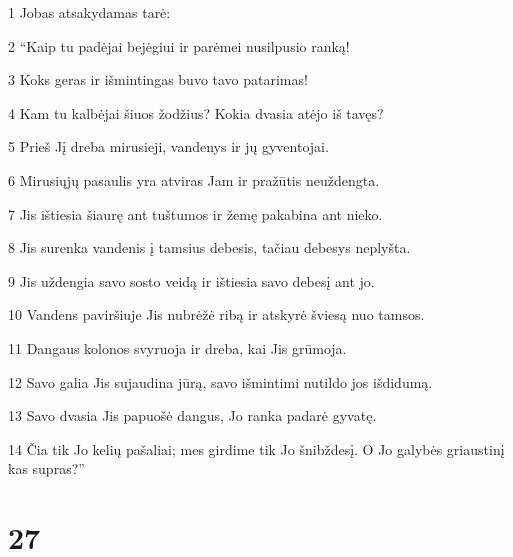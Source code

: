 \par 1 Jobas atsakydamas tarė: 
\par 2 “Kaip tu padėjai bejėgiui ir parėmei nusilpusio ranką! 
\par 3 Koks geras ir išmintingas buvo tavo patarimas! 
\par 4 Kam tu kalbėjai šiuos žodžius? Kokia dvasia atėjo iš tavęs? 
\par 5 Prieš Jį dreba mirusieji, vandenys ir jų gyventojai. 
\par 6 Mirusiųjų pasaulis yra atviras Jam ir pražūtis neuždengta. 
\par 7 Jis ištiesia šiaurę ant tuštumos ir žemę pakabina ant nieko. 
\par 8 Jis surenka vandenis į tamsius debesis, tačiau debesys neplyšta. 
\par 9 Jis uždengia savo sosto veidą ir ištiesia savo debesį ant jo. 
\par 10 Vandens paviršiuje Jis nubrėžė ribą ir atskyrė šviesą nuo tamsos. 
\par 11 Dangaus kolonos svyruoja ir dreba, kai Jis grūmoja. 
\par 12 Savo galia Jis sujaudina jūrą, savo išmintimi nutildo jos išdidumą. 
\par 13 Savo dvasia Jis papuošė dangus, Jo ranka padarė gyvatę. 
\par 14 Čia tik Jo kelių pašaliai; mes girdime tik Jo šnibždesį. O Jo galybės griaustinį kas supras?”



\chapter{27}


